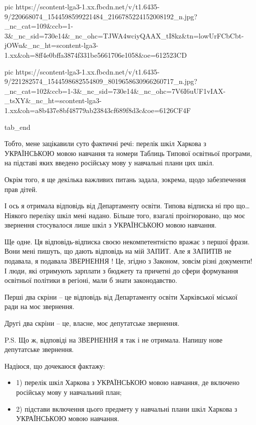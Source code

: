      pic https://scontent-lga3-1.xx.fbcdn.net/v/t1.6435-9/220668074_1544598599221484_2166785224152008192_n.jpg?_nc_cat=109&ccb=1-3&_nc_sid=730e14&_nc_ohc=TJWA4wciyQAAX_tI8kz&tn=lowUrFCbCbt-jOWu&_nc_ht=scontent-lga3-1.xx&oh=8ff4e0bffa3874f331be5661706e1058&oe=612523CD

     pic https://scontent-lga3-1.xx.fbcdn.net/v/t1.6435-9/221282574_1544598682554809_8019658630966260717_n.jpg?_nc_cat=102&ccb=1-3&_nc_sid=730e14&_nc_ohc=7V6I6uUF1vIAX-_tsXY&_nc_ht=scontent-lga3-1.xx&oh=a8b437e8bf48779ab23843cf689f8d3c&oe=6126CF4F

  tab_end
\fi


Тобто, мене зацікавили суто фактичні речі: перелік шкіл Харкова з УКРАЇНСЬКОЮ
мовою навчання та номери Таблиць Типової освітньої програми, на підставі яких
введено російську мову у навчальні плани цих шкіл.

Окрім того, я ще декілька важливих питань задала, зокрема, щодо забезпечення прав дітей.

І ось я отримала відповідь від Департаменту освіти. Типова відписка ні про що…
Ніякого переліку шкіл мені надано. Більше того, взагалі проігноровано, що моє
звернення стосувалося лише шкіл з УКРАЇНСЬКОЮ мовою навчання.

Ще одне. Ця відповідь-відписка своєю некомпетентністю вражає з першої фрази.
Вони мені пишуть, що дають відповідь на мій ЗАПИТ. Але я ЗАПИТІВ не подавала, я
подавала ЗВЕРНЕННЯ ! Це, згідно з Законом, зовсім різні документи! І люди, які
отримують зарплати з бюджету та причетні до сфери формування освітньої політики
в регіоні, мали б знати законодавство.

Перші два скріни – це відповідь від Департаменту освіти Харківської міської ради на моє звернення.

Другі два скріни – це, власне, моє депутатське звернення.

P.S. Що ж, відповіді на ЗВЕРНЕННЯ я так і не отримала. Напишу нове депутатське звернення. 

Надіюся, що дочекаюся фактажу: 

\begin{itemize}
  \item 1) перелік шкіл Харкова з УКРАЇНСЬКОЮ мовою навчання, де включено російську мову у навчальний план; 
  \item 2) підстави включення цього предмету у навчальні плани шкіл Харкова з УКРАЇНСЬКОЮ мовою навчання.
\end{itemize}


